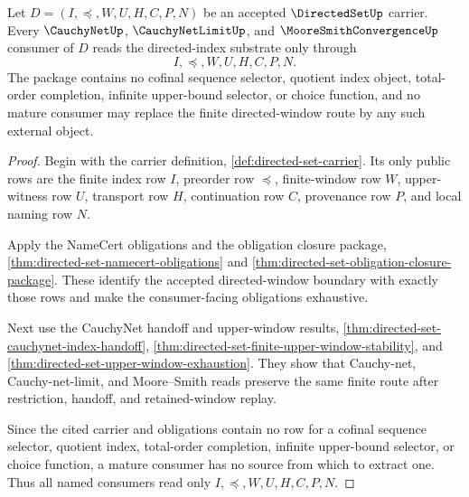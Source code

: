 \begin{theorem}
\label{thm:directed-set-mature-consumer-package}
Let $D=(I,\preceq,W,U,H,C,P,N)$ be an accepted $\DirectedSetUp$ carrier. Every $\CauchyNetUp$, $\CauchyNetLimitUp$, and $\MooreSmithConvergenceUp$ consumer of $D$ reads the directed-index substrate only through
$$
I,\preceq,W,U,H,C,P,N .
$$
The package contains no cofinal sequence selector, quotient index object, total-order completion, infinite upper-bound selector, or choice function, and no mature consumer may replace the finite directed-window route by any such external object.
\end{theorem}
\begin{proof}
Begin with the carrier definition, \autoref{def:directed-set-carrier}. Its only public rows are the finite index row $I$, preorder row $\preceq$, finite-window row $W$, upper-witness row $U$, transport row $H$, continuation row $C$, provenance row $P$, and local naming row $N$.

Apply the NameCert obligations and the obligation closure package, \autoref{thm:directed-set-namecert-obligations} and \autoref{thm:directed-set-obligation-closure-package}. These identify the accepted directed-window boundary with exactly those rows and make the consumer-facing obligations exhaustive.

Next use the CauchyNet handoff and upper-window results, \autoref{thm:directed-set-cauchynet-index-handoff}, \autoref{thm:directed-set-finite-upper-window-stability}, and \autoref{thm:directed-set-upper-window-exhaustion}. They show that Cauchy-net, Cauchy-net-limit, and Moore--Smith reads preserve the same finite route after restriction, handoff, and retained-window replay.

Since the cited carrier and obligations contain no row for a cofinal sequence selector, quotient index, total-order completion, infinite upper-bound selector, or choice function, a mature consumer has no source from which to extract one. Thus all named consumers read only $I,\preceq,W,U,H,C,P,N$.
\end{proof}


